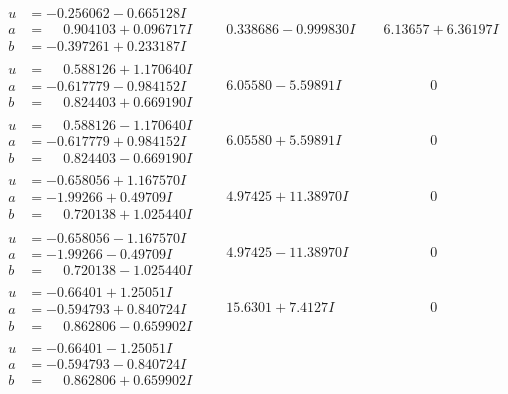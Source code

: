 \documentclass[1p]{elsarticle_modified}
\theoremstyle{definition}
\begin{document}
$$\begin{array}{c|c|c}
\begin{aligned}
u &= -0.256062 - 0.665128 I \\
a &= \phantom{-}0.904103 + 0.096717 I \\
b &= -0.397261 + 0.233187 I\end{aligned}
 & \phantom{-}0.338686 - 0.999830 I & \phantom{-}6.13657 + 6.36197 I \\ \hline\begin{aligned}
u &= \phantom{-}0.588126 + 1.170640 I \\
a &= -0.617779 - 0.984152 I \\
b &= \phantom{-}0.824403 + 0.669190 I\end{aligned}
 & \phantom{-}6.05580 - 5.59891 I & \phantom{-0.000000 } 0 \\ \hline\begin{aligned}
u &= \phantom{-}0.588126 - 1.170640 I \\
a &= -0.617779 + 0.984152 I \\
b &= \phantom{-}0.824403 - 0.669190 I\end{aligned}
 & \phantom{-}6.05580 + 5.59891 I & \phantom{-0.000000 } 0 \\ \hline\begin{aligned}
u &= -0.658056 + 1.167570 I \\
a &= -1.99266 + 0.49709 I \\
b &= \phantom{-}0.720138 + 1.025440 I\end{aligned}
 & \phantom{-}4.97425 + 11.38970 I & \phantom{-0.000000 } 0 \\ \hline\begin{aligned}
u &= -0.658056 - 1.167570 I \\
a &= -1.99266 - 0.49709 I \\
b &= \phantom{-}0.720138 - 1.025440 I\end{aligned}
 & \phantom{-}4.97425 - 11.38970 I & \phantom{-0.000000 } 0 \\ \hline\begin{aligned}
u &= -0.66401 + 1.25051 I \\
a &= -0.594793 + 0.840724 I \\
b &= \phantom{-}0.862806 - 0.659902 I\end{aligned}
 & \phantom{-}15.6301 + 7.4127 I & \phantom{-0.000000 } 0 \\ \hline\begin{aligned}
u &= -0.66401 - 1.25051 I \\
a &= -0.594793 - 0.840724 I \\
b &= \phantom{-}0.862806 + 0.659902 I\end{aligned}

\end{array}$$
\end{document}
